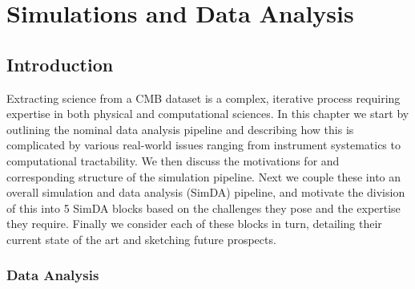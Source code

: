  
\chapter{Simulations and Data Analysis}
\renewcommand*\thesection{\arabic{section}}


\section{Introduction}

Extracting science from a CMB dataset is a complex, iterative process requiring expertise in both physical and computational sciences. In this chapter we start by outlining the nominal data analysis pipeline and describing how this is complicated by various real-world issues ranging from instrument systematics to computational tractability. We then discuss the motivations for and corresponding structure of the simulation pipeline. Next we couple these into an overall simulation and data analysis (SimDA) pipeline, and motivate the division of this into 5 SimDA blocks based on the challenges they pose and the expertise they require. Finally we consider each of these blocks in turn, detailing their current state of the art and sketching future prospects.

\newpage

\subsection{Data Analysis}

